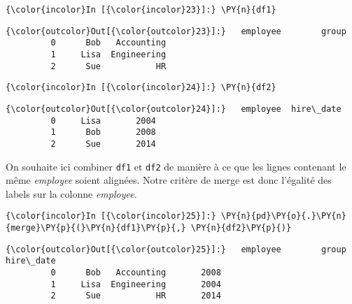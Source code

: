     \begin{Verbatim}[commandchars=\\\{\},frame=single,framerule=0.3mm,rulecolor=\color{cellframecolor}]
{\color{incolor}In [{\color{incolor}23}]:} \PY{n}{df1}
\end{Verbatim}


\begin{Verbatim}[commandchars=\\\{\},frame=single,framerule=0.3mm,rulecolor=\color{cellframecolor}]
{\color{outcolor}Out[{\color{outcolor}23}]:}   employee        group
         0      Bob   Accounting
         1     Lisa  Engineering
         2      Sue           HR
\end{Verbatim}
            
    \begin{Verbatim}[commandchars=\\\{\},frame=single,framerule=0.3mm,rulecolor=\color{cellframecolor}]
{\color{incolor}In [{\color{incolor}24}]:} \PY{n}{df2}
\end{Verbatim}


\begin{Verbatim}[commandchars=\\\{\},frame=single,framerule=0.3mm,rulecolor=\color{cellframecolor}]
{\color{outcolor}Out[{\color{outcolor}24}]:}   employee  hire\_date
         0     Lisa       2004
         1      Bob       2008
         2      Sue       2014
\end{Verbatim}
            
    On souhaite ici combiner \texttt{df1} et \texttt{df2} de manière à ce
que les lignes contenant le même \emph{employee} soient alignées. Notre
critère de merge est donc l'égalité des labels sur la colonne
\emph{employee}.

    \begin{Verbatim}[commandchars=\\\{\},frame=single,framerule=0.3mm,rulecolor=\color{cellframecolor}]
{\color{incolor}In [{\color{incolor}25}]:} \PY{n}{pd}\PY{o}{.}\PY{n}{merge}\PY{p}{(}\PY{n}{df1}\PY{p}{,} \PY{n}{df2}\PY{p}{)}
\end{Verbatim}


\begin{Verbatim}[commandchars=\\\{\},frame=single,framerule=0.3mm,rulecolor=\color{cellframecolor}]
{\color{outcolor}Out[{\color{outcolor}25}]:}   employee        group  hire\_date
         0      Bob   Accounting       2008
         1     Lisa  Engineering       2004
         2      Sue           HR       2014
\end{Verbatim}
            
